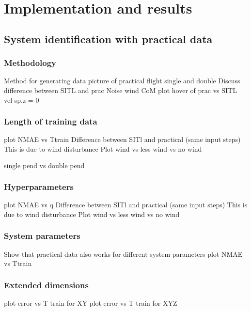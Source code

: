 \graphicspath{{results/fig/}}

\chapter{Implementation and results}
\label{chap:results}

    \section{System identification with practical data}

        \subsection{Methodology}
            Method for generating data
            picture of practical flight single and double
            Discuss difference between SITL and prac
                Noise 
                wind
                CoM
            plot hover of prac vs SITL vel-sp.z = 0

        \subsection{Length of training data}
            plot NMAE vs Ttrain
            Difference between SITl and practical (same input steps)
            This is due to wind disturbance
            Plot wind vs less wind vs no wind

            single pend vs double pend

        \subsection{Hyperparameters}
            plot NMAE vs q
            Difference between SITl and practical (same input steps)
            This is due to wind disturbance
            Plot wind vs less wind vs no wind
            
        \subsection{System parameters}
            Show that practical data also works for different system parameters
            plot NMAE vs Ttrain

        \subsection{Extended dimensions}
            plot error vs T-train for  XY
            plot error vs T-train for  XYZ

